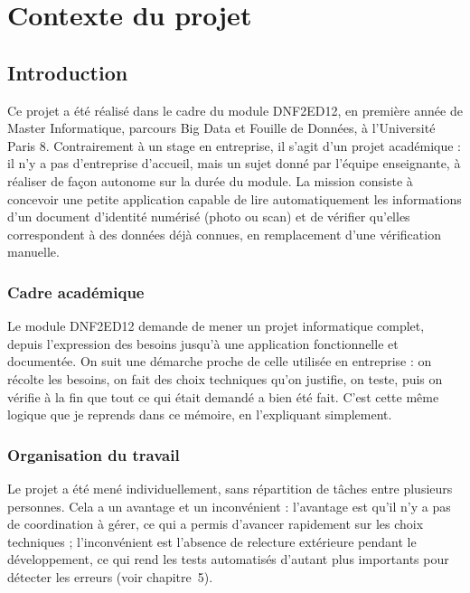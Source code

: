 \chapter{Contexte du projet}
\minitoc
\newpage

\section{Introduction}

Ce projet a été réalisé dans le cadre du module DNF2ED12, en première année de Master Informatique, parcours Big Data et Fouille de Données, à l'Université Paris 8. Contrairement à un stage en entreprise, il s'agit d'un projet académique : il n'y a pas d'entreprise d'accueil, mais un sujet donné par l'équipe enseignante, à réaliser de façon autonome sur la durée du module. La mission consiste à concevoir une petite application capable de lire automatiquement les informations d'un document d'identité numérisé (photo ou scan) et de vérifier qu'elles correspondent à des données déjà connues, en remplacement d'une vérification manuelle.

\subsection{Cadre académique}

Le module DNF2ED12 demande de mener un projet informatique complet, depuis l'expression des besoins jusqu'à une application fonctionnelle et documentée. On suit une démarche proche de celle utilisée en entreprise : on récolte les besoins, on fait des choix techniques qu'on justifie, on teste, puis on vérifie à la fin que tout ce qui était demandé a bien été fait. C'est cette même logique que je reprends dans ce mémoire, en l'expliquant simplement.

\subsection{Organisation du travail}

Le projet a été mené individuellement, sans répartition de tâches entre plusieurs personnes. Cela a un avantage et un inconvénient : l'avantage est qu'il n'y a pas de coordination à gérer, ce qui a permis d'avancer rapidement sur les choix techniques ; l'inconvénient est l'absence de relecture extérieure pendant le développement, ce qui rend les tests automatisés d'autant plus importants pour détecter les erreurs (voir chapitre~5).

